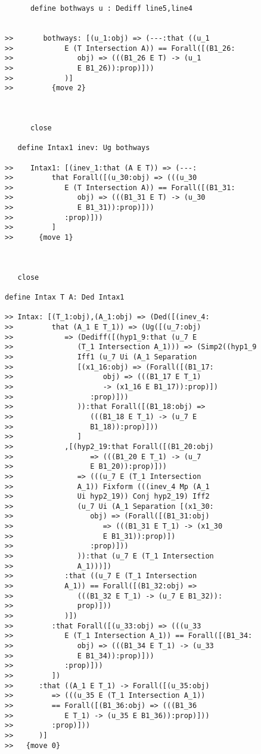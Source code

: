 \documentclass[12pt]{article}
\begin{document}
\begin{verbatim}
      define bothways u : Dediff line5,line4


>>       bothways: [(u_1:obj) => (---:that ((u_1
>>            E (T Intersection A)) == Forall([(B1_26:
>>               obj) => (((B1_26 E T) -> (u_1
>>               E B1_26)):prop)]))
>>            )]
>>         {move 2}



      close

   define Intax1 inev: Ug bothways

>>    Intax1: [(inev_1:that (A E T)) => (---:
>>         that Forall([(u_30:obj) => (((u_30
>>            E (T Intersection A)) == Forall([(B1_31:
>>               obj) => (((B1_31 E T) -> (u_30
>>               E B1_31)):prop)]))
>>            :prop)]))
>>         ]
>>      {move 1}



   close

define Intax T A: Ded Intax1

>> Intax: [(T_1:obj),(A_1:obj) => (Ded([(inev_4:
>>         that (A_1 E T_1)) => (Ug([(u_7:obj)
>>            => (Dediff([(hyp1_9:that (u_7 E
>>               (T_1 Intersection A_1))) => (Simp2((hyp1_9
>>               Iff1 (u_7 Ui (A_1 Separation
>>               [(x1_16:obj) => (Forall([(B1_17:
>>                     obj) => (((B1_17 E T_1)
>>                     -> (x1_16 E B1_17)):prop)])
>>                  :prop)]))
>>               )):that Forall([(B1_18:obj) =>
>>                  (((B1_18 E T_1) -> (u_7 E
>>                  B1_18)):prop)]))
>>               ]
>>            ,[(hyp2_19:that Forall([(B1_20:obj)
>>                  => (((B1_20 E T_1) -> (u_7
>>                  E B1_20)):prop)]))
>>               => (((u_7 E (T_1 Intersection
>>               A_1)) Fixform (((inev_4 Mp (A_1
>>               Ui hyp2_19)) Conj hyp2_19) Iff2
>>               (u_7 Ui (A_1 Separation [(x1_30:
>>                  obj) => (Forall([(B1_31:obj)
>>                     => (((B1_31 E T_1) -> (x1_30
>>                     E B1_31)):prop)])
>>                  :prop)]))
>>               )):that (u_7 E (T_1 Intersection
>>               A_1)))])
>>            :that ((u_7 E (T_1 Intersection
>>            A_1)) == Forall([(B1_32:obj) =>
>>               (((B1_32 E T_1) -> (u_7 E B1_32)):
>>               prop)]))
>>            )])
>>         :that Forall([(u_33:obj) => (((u_33
>>            E (T_1 Intersection A_1)) == Forall([(B1_34:
>>               obj) => (((B1_34 E T_1) -> (u_33
>>               E B1_34)):prop)]))
>>            :prop)]))
>>         ])
>>      :that ((A_1 E T_1) -> Forall([(u_35:obj)
>>         => (((u_35 E (T_1 Intersection A_1))
>>         == Forall([(B1_36:obj) => (((B1_36
>>            E T_1) -> (u_35 E B1_36)):prop)]))
>>         :prop)]))
>>      )]
>>   {move 0}


\end{verbatim}
\end{document}
